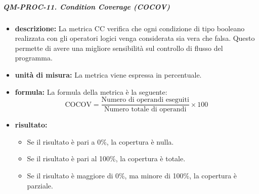                 \subparagraph{QM-PROC-11. Condition Coverage (COCOV)}
                    \begin{itemize}
                    \item \textbf{descrizione: }
                        La metrica CC verifica che ogni condizione di tipo booleano realizzata con gli operatori logici venga considerata sia vera che falsa. Questo permette di avere una migliore sensibilità sul controllo di flusso del programma.

                    \item \textbf{unità di misura: }
                    La metrica viene espressa in percentuale.

                    \item \textbf{formula: }
                    La formula della metrica è la seguente:
                    \[
                        \text{COCOV} = \frac{\text{Numero di operandi eseguiti}}{\text{Numero totale di operandi}} \times 100
                    \]

                    \item \textbf{risultato: }
                    \begin{itemize}
                        \item Se il risultato è pari a 0\%, la copertura è nulla.
                        \item Se il risultato è pari al 100\%, la copertura è totale.
                        \item Se il risultato è maggiore di 0\%, ma minore di 100\%, la copertura è parziale.
                    \end{itemize}
            \end{itemize}

